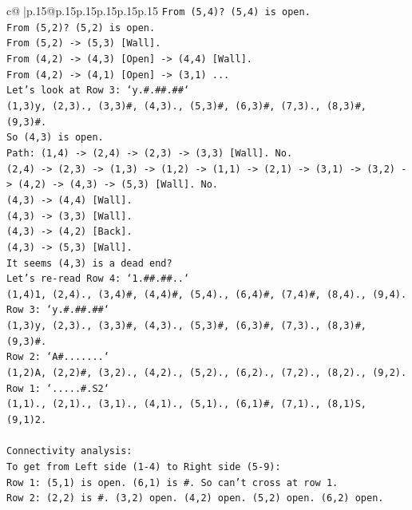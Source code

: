 \documentclass{article}
\begin{document}
{\begin{supertabular}{c@{$\;$}|p{.15\linewidth}@{}p{.15\linewidth}p{.15\linewidth}p{.15\linewidth}p{.15\linewidth}p{.15\linewidth}}
{{{\texttt{From (5,4)? (5,4) is open.} \\
\texttt{From (5,2)? (5,2) is open.} \\
\texttt{From (5,2) {-}> (5,3) {[}Wall{]}.} \\
\texttt{From (4,2) {-}> (4,3) {[}Open{]} {-}> (4,4) {[}Wall{]}.} \\
\texttt{From (4,2) {-}> (4,1) {[}Open{]} {-}> (3,1) ...} \\
\texttt{Let's look at Row 3: `y.\#.\#\#.\#\#`} \\
\texttt{(1,3)y, (2,3)., (3,3)\#, (4,3)., (5,3)\#, (6,3)\#, (7,3)., (8,3)\#, (9,3)\#.} \\
\texttt{So (4,3) is open.} \\
\texttt{Path: (1,4) {-}> (2,4) {-}> (2,3) {-}> (3,3) {[}Wall{]}. No.} \\
\texttt{(2,4) {-}> (2,3) {-}> (1,3) {-}> (1,2) {-}> (1,1) {-}> (2,1) {-}> (3,1) {-}> (3,2) {-}> (4,2) {-}> (4,3) {-}> (5,3) {[}Wall{]}. No.} \\
\texttt{(4,3) {-}> (4,4) {[}Wall{]}.} \\
\texttt{(4,3) {-}> (3,3) {[}Wall{]}.} \\
\texttt{(4,3) {-}> (4,2) {[}Back{]}.} \\
\texttt{(4,3) {-}> (5,3) {[}Wall{]}.} \\
\texttt{It seems (4,3) is a dead end?} \\
\texttt{Let's re{-}read Row 4: `1.\#\#.\#\#..`} \\
\texttt{(1,4)1, (2,4)., (3,4)\#, (4,4)\#, (5,4)., (6,4)\#, (7,4)\#, (8,4)., (9,4).} \\
\texttt{Row 3: `y.\#.\#\#.\#\#`} \\
\texttt{(1,3)y, (2,3)., (3,3)\#, (4,3)., (5,3)\#, (6,3)\#, (7,3)., (8,3)\#, (9,3)\#.} \\
\texttt{Row 2: `A\#.......`} \\
\texttt{(1,2)A, (2,2)\#, (3,2)., (4,2)., (5,2)., (6,2)., (7,2)., (8,2)., (9,2).} \\
\texttt{Row 1: `.....\#.S2`} \\
\texttt{(1,1)., (2,1)., (3,1)., (4,1)., (5,1)., (6,1)\#, (7,1)., (8,1)S, (9,1)2.} \\
\\ 
\texttt{Connectivity analysis:} \\
\texttt{To get from Left side (1{-}4) to Right side (5{-}9):} \\
\texttt{Row 1: (5,1) is open. (6,1) is \#. So can't cross at row 1.} \\
\texttt{Row 2: (2,2) is \#. (3,2) open. (4,2) open. (5,2) open. (6,2) open.} \\
}}}
\end{supertabular}}
\end{document}
